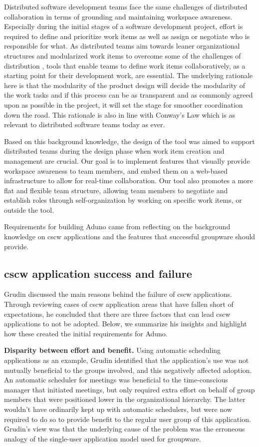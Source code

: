 \documentclass[conference]{IEEEtran}
\begin{document}
Distributed software development teams face the same challenges of distributed collaboration in terms of grounding and maintaining workspace awareness. Especially during the initial stages of a software development project, effort is required to define and prioritize work items as well as assign or negotiate who is responsible for what. As distributed teams aim towards leaner organizational structures and modularized work items to overcome some of the challenges of distribution \cite{Herbsleb07, HG99, Parnas72}, tools that enable teams to define work items collaboratively, as a starting point for their development work, are essential. The underlying rationale here is that the modularity of the product design will decide the modularity of the work tasks and if this process can be as transparent and as commonly agreed upon as possible in the project, it will set the stage for smoother coordination down the road. This rationale is also in line with Conway's Law \cite{Conway68} which is as relevant to distributed software teams today as ever.

Based on this background knowledge, the design of the tool was aimed to support distributed teams during the design phase when work item creation and management are crucial. Our goal is to implement features that visually provide workspace awareness to team members, and embed them on a web-based infrastructure to allow for real-time collaboration. Our tool also promotes a more flat and flexible team structure, allowing team members to negotiate and establish roles through self-organization by working on specific work items, or outside the tool.

Requirements for building Aduno came from reflecting on the background knowledge on {\sc cscw} applications and the features that successful groupware should provide. 


\subsection{{\sc cscw} application success and failure}
Grudin \cite{Grudin88} discussed the main reasons behind the failure of {\sc cscw} applications. Through reviewing cases of {\sc cscw} application areas that have fallen short of expectations, he concluded that there are three factors that can lead {\sc cscw} applications to not be adopted. Below, we summarize his insights and highlight how these created the initial requirements for Aduno.

\textbf{Disparity between effort and benefit.} Using automatic scheduling applications as an example, Grudin identified that the application's use was not mutually beneficial to the groups involved, and this negatively affected adoption. An automatic scheduler for meetings was beneficial to the time-conscious manager that initiated meetings, but only required extra effort on behalf of group members that were positioned lower in the organizational hierarchy. The latter wouldn't have ordinarily kept up with automatic schedulers, but were now required to do so to provide benefit to the regular user group of this application. Grudin's view was that the underlying cause of the problem was the erroneous analogy of the single-user application model used for groupware.
\end{document}
